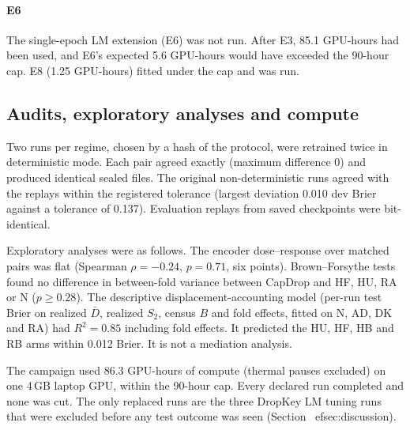 \paragraph{E6}
The single-epoch LM extension (E6) was not run. After E3, 85.1 GPU-hours had been used, and E6's expected 5.6 GPU-hours
would have exceeded the 90-hour cap. E8 (1.25 GPU-hours) fitted under the cap and was run.

\subsection{Audits, exploratory analyses and compute}\label{sec:audits}
Two runs per regime, chosen by a hash of the protocol, were retrained twice in deterministic mode. Each pair agreed exactly
(maximum difference 0) and produced identical sealed files. The original non-deterministic runs agreed with the
replays within the registered tolerance (largest deviation 0.010 dev Brier against a tolerance of 0.137). Evaluation
replays from saved checkpoints were bit-identical.

Exploratory analyses were as follows. The encoder dose--response over matched pairs was flat (Spearman $\rho=-0.24$, $p=0.71$, six
points). Brown--Forsythe tests found no difference in between-fold variance between CapDrop and HF, HU, RA or N ($p\ge0.28$). The descriptive
displacement-accounting model (per-run test Brier on realized $\bar D$, realized $S_2$, census $B$ and fold effects,
fitted on N, AD, DK and RA) had $R^2=0.85$ including fold effects. It predicted the HU, HF, HB and RB arms within
0.012 Brier. It is not a mediation analysis.

The campaign used 86.3 GPU-hours of compute (thermal pauses excluded) on one 4\,GB laptop GPU, within the 90-hour
cap. Every declared run completed and none was cut. The only replaced runs are the three DropKey LM tuning runs
that were excluded before any test outcome was seen (Section~
ef{sec:discussion}).
